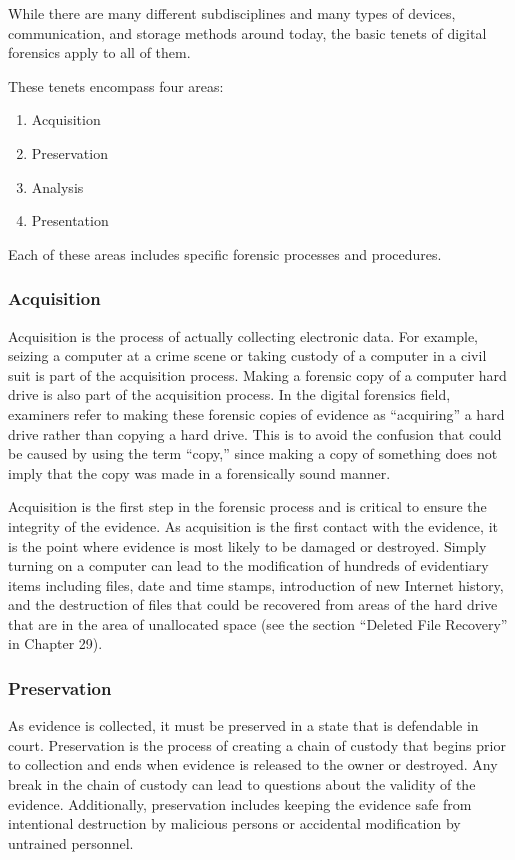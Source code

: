 While there are many different subdisciplines and many types of devices, communication,
and storage methods around today, the basic tenets of digital forensics
apply to all of them.

These tenets encompass four areas:

\begin{enumerate}
\item Acquisition
\item Preservation
\item Analysis
\item Presentation
\end{enumerate}

Each of these areas includes specific forensic processes and procedures.

\subsubsection{Acquisition}

Acquisition is the process of actually collecting electronic data. For example, seizing
a computer at a crime scene or taking custody of a computer in a civil suit is
part of the acquisition process. Making a forensic copy of a computer hard drive
is also part of the acquisition process. In the digital forensics field, examiners refer
to making these forensic copies of evidence as “acquiring” a hard drive rather than
copying a hard drive. This is to avoid the confusion that could be caused by using
the term “copy,” since making a copy of something does not imply that the copy
was made in a forensically sound manner.

Acquisition is the first step in the forensic process and is critical to ensure the
integrity of the evidence. As acquisition is the first contact with the evidence, it is
the point where evidence is most likely to be damaged or destroyed. Simply turning
on a computer can lead to the modification of hundreds of evidentiary items
including files, date and time stamps, introduction of new Internet history, and
the destruction of files that could be recovered from areas of the hard drive that
are in the area of unallocated space (see the section “Deleted File Recovery” in
Chapter 29).

\subsubsection{Preservation}

As evidence is collected, it must be preserved in a state that is defendable in court.
Preservation is the process of creating a chain of custody that begins prior to collection
and ends when evidence is released to the owner or destroyed. Any break
in the chain of custody can lead to questions about the validity of the evidence.
Additionally, preservation includes keeping the evidence safe from intentional
destruction by malicious persons or accidental modification by untrained personnel.

